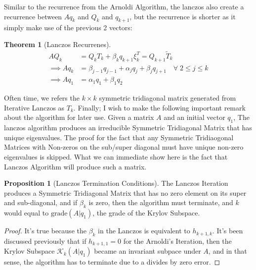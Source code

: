 \documentclass[]{article}
\theoremstyle{definition}
\newtheorem{theorem}{Theorem}            %
\newtheorem{prop}{Proposition}[section]  %
\begin{document}
            Similar to the recurrence from the Arnoldi Algorithm, the lanczos also create a recurrence between $Aq_k$ and $Q_k$ and $q_{k + 1}$, but the recurrence is shorter as it simply make use of the previous 2 vectors: 
            \begin{theorem}[Lanczos Recurrenes]
                \begin{align}
                    AQ_k &= Q_kT_k + \beta_k q_{k + 1}\xi_k^T = Q_{k + 1}\tilde{T}_k
                    \\
                    \implies Aq_k
                    &= \beta_{j - 1}q_{j - 1} + \alpha_j q_j + \beta_{j}q_{j + 1} \quad \forall\; 2\le j\le k
                    \\
                    \implies Aq_1 &= \alpha_1q_1 + \beta_1 q_2
                \end{align}    
            \end{theorem}
            \par
            Often time, we refers the $k\times k$ symmetric tridiagonal matrix generated from Iterative Lanczos as $T_k$. Finally; I wish to make the following important remark about the algorithm for later use. Given a matrix $A$ and an initial vector $q_1$, The lanczos algorithm produces an irreducible Symmetric Tridiagonal Matrix that has unique eigenvalues. The proof for the fact that any Symmetric Tridiaogonal Matrices with Non-zeros on the sub/super diagonal must have unique non-zero eigenvalues is skipped. What we can immediate show here is the fact that Lanczos Algorithm will produce such a matrix. 
            \begin{prop}[Lanczos Termination Conditions]\label{prop:Lanczos_Termination_Conditions}
                The Lanczos Iteration produces a Symmetric Tridiagonal Matrix that has no zero element on its super and sub-diagonal, and if $\beta_k$ is zero, then the algorithm must terminate, and $k$ would equal to $\text{grade}(A|q_1)$, the grade of the Krylov Subspace. 
            \end{prop}
            \begin{proof}
                It's true because the $\beta_{k}$ in the Lanczos is equivalent to $h_{k + 1, k}$. It's been discussed previously that if $h_{k + 1, 1} = 0$ for the Arnoldi's Iteration, then the Krylov Subspace $\mathcal K_k(A|q_1)$ became an invariant subpace under $A$, and in that sense, the algorithm has to terminate due to a divides by zero error. 
            \end{proof}
\end{document}
